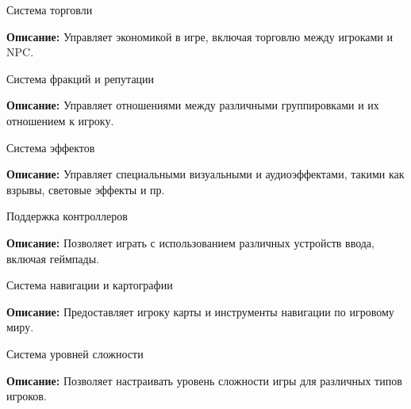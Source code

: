 \begin{DoxyEnumerate}
\item Система торговли
\end{DoxyEnumerate}
\begin{DoxyItemize}
\item {\bfseries{Описание\+:}} Управляет экономикой в игре, включая торговлю между игроками и NPC.
\end{DoxyItemize}
\begin{DoxyEnumerate}
\item Система фракций и репутации
\end{DoxyEnumerate}
\begin{DoxyItemize}
\item {\bfseries{Описание\+:}} Управляет отношениями между различными группировками и их отношением к игроку.
\end{DoxyItemize}
\begin{DoxyEnumerate}
\item Система эффектов
\end{DoxyEnumerate}
\begin{DoxyItemize}
\item {\bfseries{Описание\+:}} Управляет специальными визуальными и аудиоэффектами, такими как взрывы, световые эффекты и пр.
\end{DoxyItemize}
\begin{DoxyEnumerate}
\item Поддержка контроллеров
\end{DoxyEnumerate}
\begin{DoxyItemize}
\item {\bfseries{Описание\+:}} Позволяет играть с использованием различных устройств ввода, включая геймпады.
\end{DoxyItemize}
\begin{DoxyEnumerate}
\item Система навигации и картографии
\end{DoxyEnumerate}
\begin{DoxyItemize}
\item {\bfseries{Описание\+:}} Предоставляет игроку карты и инструменты навигации по игровому миру.
\end{DoxyItemize}
\begin{DoxyEnumerate}
\item Система уровней сложности
\end{DoxyEnumerate}
\begin{DoxyItemize}
\item {\bfseries{Описание\+:}} Позволяет настраивать уровень сложности игры для различных типов игроков. 
\end{DoxyItemize}